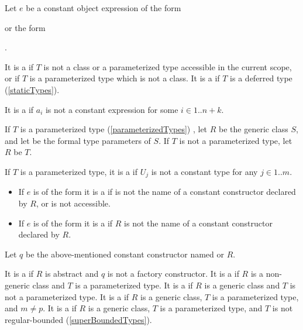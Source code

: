 \documentclass[makeidx]{article}
\begin{document}
{\LMHash{}%
Let $e$ be a constant object expression of the form

\noindent
{}
or the form

\noindent
{}.

\LMHash{}%
It is a  if $T$ is not
a class or a parameterized type accessible in the current scope,
or if $T$ is a parameterized type which is not a class.
It is a  if $T$ is a deferred type
(\ref{staticTypes}).

\LMHash{}%
It is a  if $a_i$ is not a constant expression
for some $i \in 1 .. n + k$.

\LMHash{}%
If $T$ is a parameterized type (\ref{parameterizedTypes})
,
let $R$ be the generic class $S$,
and let
be the formal type parameters of $S$.
If $T$ is not a parameterized type, let $R$ be $T$.

\LMHash{}%
If $T$ is a parameterized type,
it is a
 if $U_j$ is not a constant type for any
$j \in 1 .. m$.

\begin{itemize}
\item
  If $e$ is of the form
  it is a  if  is not the name of
  a constant constructor declared by $R$, or \id{} is not accessible.
\item
  If $e$ is of the form
  it is a  if $R$ is not the name of
  a constant constructor declared by $R$.
\end{itemize}

\LMHash{}%
Let $q$ be the above-mentioned constant constructor named  or $R$.

\LMHash{}%
It is a  if $R$ is abstract
and $q$ is not a factory constructor.
It is a  if $R$ is a non-generic class
and $T$ is a parameterized type.
It is a  if $R$ is a generic class
and $T$ is not a parameterized type.
It is a  if $R$ is a generic class,
$T$ is a parameterized type, and $m \not= p$.
It is a  if $R$ is a generic class,
$T$ is a parameterized type,
and $T$ is not regular-bounded
(\ref{superBoundedTypes}).

}
\end{document}
